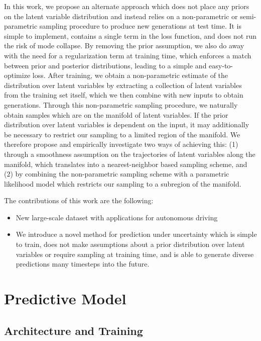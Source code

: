 \documentclass{article}
\begin{document}
In this work, we propose an alternate approach which does not place any priors on the latent variable distribution and instead relies on a non-parametric or semi-parametric sampling procedure to produce new generations at test time.
It is simple to implement, contains a single term in the loss function, and does not run the risk of mode collapse.
By removing the prior assumption, we also do away with the need for a regularization term at training time, which enforces a match between prior and posterior distributions, leading to a simple and easy-to-optimize loss.
After training, we obtain a non-parametric estimate of the distribution over latent variables by extracting a collection of latent variables from the training set itself, which we then combine with new inputs to obtain generations.
Through this non-parametric sampling procedure, we naturally obtain samples which are on the manifold of latent variables.
If the prior distribution over latent variables is dependent on the input, it may additionally be necessary to restrict our sampling to a limited region of the manifold.
We therefore propose and empirically investigate two ways of achieving this: (1) through a smoothness assumption on the trajectories of latent variables along the manifold, which translates into a nearest-neighbor based sampling scheme, and (2) by combining the non-parametric sampling scheme with a parametric likelihood model which restricts our sampling to a subregion of the manifold.

The contributions of this work are the following:
\begin{itemize}
\item New large-scale dataset with applications for autonomous driving
\item We introduce a novel method for prediction under uncertainty which is simple to train, does not make assumptions about a prior distribution over latent variables or require sampling at training time, and is able to generate diverse predictions many timesteps into the future.
\end{itemize}


\section{Predictive Model}

\subsection{Architecture and Training}
\end{document}
